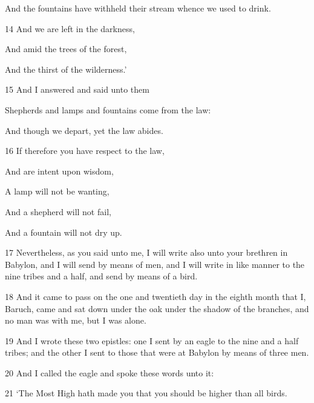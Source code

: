 \par And the fountains have withheld their stream whence we used to drink.

\par 14 And we are left in the darkness,

\par And amid the trees of the forest,

\par And the thirst of the wilderness.’

\par 15 And I answered and said unto them

\par Shepherds and lamps and fountains come from the law:

\par And though we depart, yet the law abides.

\par 16 If therefore you have respect to the law,

\par And are intent upon wisdom,

\par A lamp will not be wanting,

\par And a shepherd will not fail,

\par And a fountain will not dry up.

\par 17 Nevertheless, as you said unto me, I will write also unto your brethren in Babylon, and I will send by means of men, and I will write in like manner to the nine tribes and a half, and send by means of a bird.

\par 18 And it came to pass on the one and twentieth day in the eighth month that I, Baruch, came and sat down under the oak under the shadow of the branches, and no man was with me, but I was alone. 

\par 19 And I wrote these two epistles: one I sent by an eagle to the nine and a half tribes; and the other I sent to those that were at Babylon by means of three men. 

\par 20 And I called the eagle and spoke these words unto it: 

\par 21 ‘The Most High hath made you that you should be higher than all birds. 

